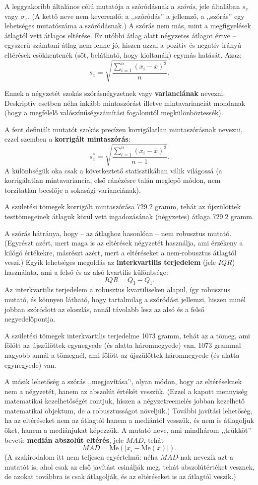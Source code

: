 \documentclass[]{book}
\begin{document}
A leggyakoribb általános célú mutatója a szóródásnak a \emph{szórás}, jele általában \(s_x\) vagy \(\sigma_x\). (A kettő neve nem keverendő: a ,,szóródás'' a jellemző, a ,,szórás'' egy lehetséges mutatószáma a szóródásnak.) A szórás nem más, mint a megfigyelések átlagtól vett átlagos eltérése. Ez utóbbi átlag alatt négyzetes átlagot értve -- egyszerű számtani átlag nem lenne jó, hiszen azzal a pozitív és negatív irányú eltérések csökkentenék (sőt, belátható, hogy kioltanák) egymás hatását. Azaz:
\[
    s_x=\sqrt{\frac{\sum_{i=1}^n \left(x_i-\overline{x}\right)^2}{n}}.
\]

Ennek a négyzetét szokás szórásnégyzetnek vagy \textbf{varianciának} nevezni. Deskriptív esetben néha inkább mintaszórást illetve mintavarianciát mondanak (hogy a megfelelő valószínűségszámítási fogalomtól megkülönböztessék).

A fent definiált mutatót szokás precízen korrigálatlan mintaszórásnak nevezni, ezzel szemben a \textbf{korrigált mintaszórás}:
\[
    s_x^{\ast}=\sqrt{\frac{\sum_{i=1}^n \left(x_i-\overline{x}\right)^2}{n-1}}.
\]
A különbségük oka csak a következtető statisztikában válik világossá (a korrigálatlan mintavariancia, első ránézésre talán meglepő módon, nem torzítatlan becslője a sokasági varianciának).

A születési tömegek korrigált mintaszórása 729.2 gramm, tehát az újszülöttek testtömegeinek átlaguk körül vett ingadozásának (négyzetes) átlaga 729.2 gramm.

A szórás hátránya, hogy -- az átlaghoz hasonlóan -- nem robusztus mutató. (Egyrészt azért, mert maga is az eltérések négyzetét használja, ami érzékeny a kilógó értékekre, másrészt azért, mert a eltéréseket a nem-robusztus átlagtól veszi.) Egyik lehetséges megoldás az \textbf{interkvartilis terjedelem} (jele \(IQR\)) használata, ami a felső és az alsó kvartilis különbsége:
\[
    IQR=Q_3-Q_1.
\]
Az interkvartilis terjedelem a robusztus kvartiliseken alapul, így robusztus mutató, és könnyen látható, hogy tartalmilag a szóródást jellemzi, hiszen minél jobban szóródott az eloszlás, annál távolabb lesz az alsó és a felső negyedelőpontja.

A születési tömegek interkvartilis terjedelme 1073 gramm, tehát az a tömeg, ami fölött az újszülöttek egynegyede (és alatta háromnegyede) van, 1073 grammal nagyobb annál a tömegnél, ami fölött az újszülöttek háromnegyede (és alatta egynegyede) van.

A másik lehetőség a szórás ,,megjavítása'`, olyan módon, hogy az eltéréseknek nem a négyzetét, hanem az abszolút értékét vesszük. (Ezzel a kapott mennyiség matematikai kezelhetőségét rontjuk, hiszen a négyzetreemelés jobban kezelhető matematikai objektum, de a robusztusságot növeljük.) További javítási lehetőség, ha az eltéréseket nem az átlagtól hanem a mediántól vesszük, és nem is átlagoljuk őket, hanem a mediánjukat képezzük. A mutató neve, ami mindhárom ,,trükköt'' beveti: \textbf{medián abszolút eltérés}, jele \(MAD\), tehát
\[
    MAD=\mathrm{Me}\left(\left|x_i-\mathrm{Me}\left(x\right)\right|\right).
\]
(A szakirodalom itt nem teljesen egyértelmű: néha \(MAD\)-nak nevezik azt a mutatót is, ahol csak az első javítást csinálják meg, tehát abszolútértéket vesznek, de azokat továbbra is csak átlagolják, és az eltéréseket is az átlagtól veszik.)
\end{document}
